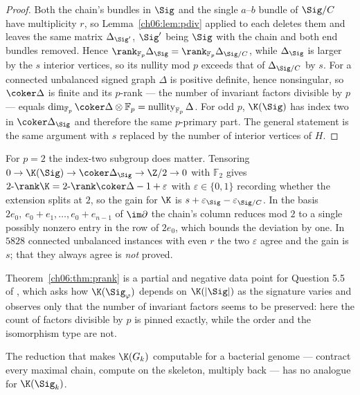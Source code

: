 \begin{proof}
Both the chain's bundles in $\Sig$ and the single $a$--$b$ bundle of $\Sig/C$ have
multiplicity $r$, so Lemma~\ref{ch06:lem:pdiv} applied to each deletes them and leaves the same
matrix $\Delta_{\Sig'}$, $\Sig'$ being $\Sig$ with the chain and both end bundles removed.
Hence $\rank_{\mathbb F_p}\Delta_\Sig=\rank_{\mathbb F_p}\Delta_{\Sig/C}$, while $\Delta_\Sig$
is larger by the $s$ interior vertices, so its nullity mod $p$ exceeds that of
$\Delta_{\Sig/C}$ by $s$. For a connected unbalanced signed graph $\Delta$ is positive
definite, hence nonsingular, so $\coker\Delta$ is finite and its $p$-rank --- the number of
invariant factors divisible by $p$ --- equals $\dim_{\mathbb F_p}\coker\Delta\otimes\mathbb F_p
=\operatorname{nullity}_{\mathbb F_p}\Delta$. For odd $p$, $\K(\Sig)$ has index two in
$\coker\Delta_\Sig$ and therefore the same $p$-primary part. The general statement is the
same argument with $s$ replaced by the number of interior vertices of $H$.
\end{proof}

\begin{remark}[what happens at $p=2$]\label{ch06:rem:ptwo}
For $p=2$ the index-two subgroup does matter. Tensoring
$0\to\K(\Sig)\to\coker\Delta_\Sig\to\Z/2\to0$ with $\mathbb F_2$ gives
$2\text{-}\rank\K=2\text{-}\rank\coker\Delta-1+\varepsilon$ with $\varepsilon\in\{0,1\}$
recording whether the extension splits at $2$, so the gain for $\K$ is
$s+\varepsilon_\Sig-\varepsilon_{\Sig/C}$. In the basis
$2e_0,\ e_0+e_1,\dots,e_0+e_{n-1}$ of $\im\partial$ the chain's column reduces mod $2$ to a
single possibly nonzero entry in the row of $2e_0$, which bounds the deviation by one. In
$5828$ connected unbalanced instances with even $r$ the two $\varepsilon$ agree and the gain
is $s$; that they always agree is \emph{not} proved.
\end{remark}

Theorem~\ref{ch06:thm:prank} is a partial and negative data point for Question 5.5 of
\cite{CDIOSZ}, which asks how $\K(\Sig_\varphi)$ depends on $\K(|\Sig|)$ as the signature
varies and observes only that the number of invariant factors seems to be preserved: here the
count of factors divisible by $p$ is pinned exactly, while the order and the isomorphism type
are not.

\begin{corollary}\label{ch06:cor:nocompute}
The reduction that makes $\K(G_k)$ computable for a bacterial genome --- contract every
maximal chain, compute on the skeleton, multiply back --- has no analogue for $\K(\Sig_k)$.
\end{corollary}

